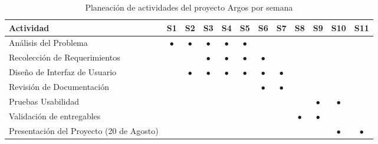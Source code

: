 \begin{table}[htbp]
  \centering
  \caption{Planeación de actividades del proyecto Argos por semana}
  \begin{tabular}{lccccccccccc}
    \toprule
    \rowcolor{gray!30}
    \textbf{Actividad} & \textbf{S1} & \textbf{S2} & \textbf{S3} & \textbf{S4} & \textbf{S5} & \textbf{S6} & \textbf{S7} & \textbf{S8} & \textbf{S9} & \textbf{S10} & \textbf{S11} \\
    \midrule
    Análisis del Problema & \cellcolor{green!30}$\bullet$ & \cellcolor{green!30}$\bullet$ & \cellcolor{green!30}$\bullet$ & \cellcolor{green!30}$\bullet$ & \cellcolor{green!30}$\bullet$ &  &  &  &  &  &  \\
    Recolección de Requerimientos &  &  & \cellcolor{blue!20}$\bullet$ & \cellcolor{blue!20}$\bullet$ & \cellcolor{blue!20}$\bullet$  & \cellcolor{blue!20}$\bullet$  &  &  &  &  &  \\
    Diseño de Interfaz de Usuario &  & \cellcolor{orange!30}$\bullet$ & \cellcolor{orange!30}$\bullet$ & \cellcolor{orange!30}$\bullet$ & \cellcolor{orange!30}$\bullet$ & \cellcolor{orange!30}$\bullet$ & \cellcolor{orange!30}$\bullet$ &  &  &  &  \\
    Revisión de Documentación &  &  &  &  &  & \cellcolor{purple!20}$\bullet$ & \cellcolor{purple!20}$\bullet$ &  &  &  &  \\
    Pruebas Usabilidad &  &  &  &  &  &  &  &  & \cellcolor{cyan!20}$\bullet$ & \cellcolor{cyan!20}$\bullet$ &  \\
    Validación de entregables &  &  &  &  &  &  &  & \cellcolor{red!20}$\bullet$ & \cellcolor{red!20}$\bullet$ &  &  \\
    Presentación del Proyecto (20 de Agosto) &  &  &  &  &  &  &  &  &  & \cellcolor{gray!60}$\bullet$ & \cellcolor{gray!60}$\bullet$ \\
    \bottomrule
  \end{tabular}
  \label{tab:planeacion_argos}
\end{table}